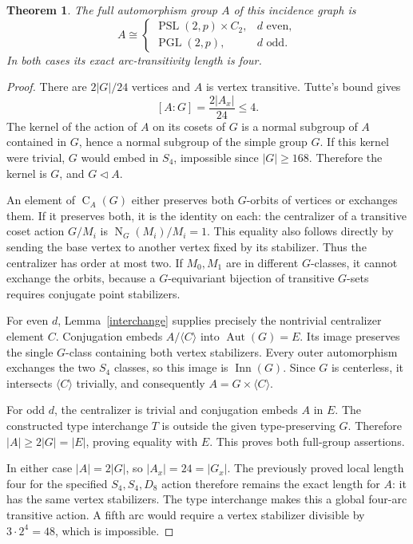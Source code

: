 \documentclass[11pt]{article}
\newtheorem{theorem}[lemma]{Theorem}
\newcommand{\PSL}{\operatorname{PSL}}
\newcommand{\PGL}{\operatorname{PGL}}
\newcommand{\Aut}{\operatorname{Aut}}
\newcommand{\N}{\operatorname{N}}
\newcommand{\Cen}{\operatorname{C}}
\begin{document}
\begin{theorem}\label{full}
The full automorphism group $A$ of this incidence graph is
\[
 A\cong
 \begin{cases}
 \PSL(2,p)\times C_2,& d\text{ even},\\
 \PGL(2,p),& d\text{ odd}.
 \end{cases}
\]
In both cases its exact arc-transitivity length is four.
\end{theorem}
\begin{proof}
There are $2|G|/24$ vertices and $A$ is vertex transitive. Tutte's
bound gives
\[
 [A:G]=\frac{2|A_x|}{24}\le4.
\]
The kernel of the action of $A$ on its cosets of $G$ is a normal
subgroup of $A$ contained in $G$, hence a normal subgroup of the
simple group $G$. If this kernel were trivial, $G$ would embed in
$S_4$, impossible since $|G|\ge168$. Therefore the kernel is $G$,
and $G\triangleleft A$.

An element of $\Cen_A(G)$ either preserves both $G$-orbits of
vertices or exchanges them. If it preserves both, it is the identity
on each: the centralizer of a transitive coset action $G/M_i$ is
$\N_G(M_i)/M_i=1$. This equality also follows directly by sending
the base vertex to another vertex fixed by its stabilizer. Thus the
centralizer has order at most two. If $M_0,M_1$ are in different
$G$-classes, it cannot exchange the orbits, because a $G$-equivariant
bijection of transitive $G$-sets requires conjugate point stabilizers.

For even $d$, Lemma~\ref{interchange} supplies precisely the
nontrivial centralizer element $C$. Conjugation embeds
$A/\langle C\rangle$ into $\Aut(G)=E$. Its image preserves the
single $G$-class containing both vertex stabilizers. Every outer
automorphism exchanges the two $S_4$ classes, so this image is
$\operatorname{Inn}(G)$. Since $G$ is centerless, it intersects
$\langle C\rangle$ trivially, and consequently
$A=G\times\langle C\rangle$.

For odd $d$, the centralizer is trivial and conjugation embeds $A$
in $E$. The constructed type interchange $T$ is outside the given
type-preserving $G$. Therefore $|A|\ge2|G|=|E|$, proving equality
with $E$. This proves both full-group assertions.

In either case $|A|=2|G|$, so $|A_x|=24=|G_x|$. The previously
proved local length four for the specified $S_4,S_4,D_8$ action
therefore remains the exact length for $A$: it has the same vertex
stabilizers. The type interchange makes this a global four-arc
transitive action. A fifth arc would require a vertex stabilizer
divisible by $3\cdot2^4=48$, which is impossible.
\end{proof}
\end{document}
